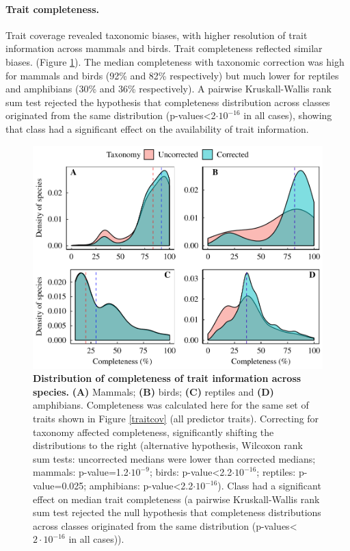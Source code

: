 \paragraph{Trait completeness.}
Trait coverage revealed taxonomic biases, with higher resolution of trait information across mammals and birds. Trait completeness reflected similar biases. (Figure \ref{traitcomp}). The median completeness with taxonomic correction was high for mammals and birds (92\% and 82\% respectively) but much lower for reptiles and amphibians (30\% and 36\% respectively). A pairwise Kruskall-Wallis rank sum test rejected the hypothesis that completeness distribution across classes originated from the same distribution (p-values<2$\cdot10^{-16}$ in all cases), showing that class had a significant effect on the availability of trait information. 

\begin{figure}[h!]
\centering
\includegraphics[scale=0.70]{figures/chapter2/Trait_coverage/Missing_values/Traitcompleteness}
\caption[Distribution of completeness of trait information across species]{\textbf{Distribution of completeness of trait information across species.} \textbf{(A)} Mammals; \textbf{(B)} birds; \textbf{(C)} reptiles and \textbf{(D)} amphibians. Completeness was calculated here for the same set of traits shown in Figure \ref{traitcov} (all predictor traits). Correcting for taxonomy affected completeness, significantly shifting the distributions to the right (alternative hypothesis, Wilcoxon rank sum tests: uncorrected medians were lower than corrected medians; mammals: p-value=1.2$\cdot10^{-9}$; birds: p-value<2.2$\cdot10^{-16}$; reptiles: p-value=0.025; amphibians: p-value<2.2$\cdot10^{-16}$). Class had a significant effect on median trait completeness (a pairwise Kruskall-Wallis rank sum test rejected the null hypothesis that completeness distributions across classes originated from the same distribution (p-values<$2\cdot10^{-16}$ in all cases)).}
\label{traitcomp}
\end{figure}


